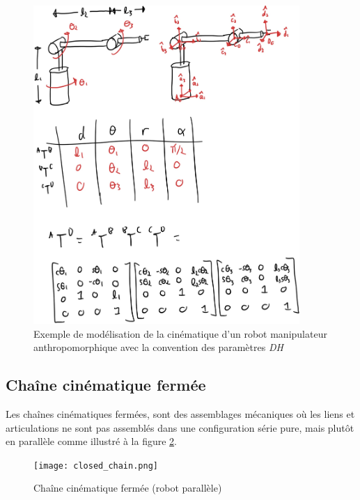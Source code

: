 \begin{figure}[H]
	\centering
	\includegraphics[width=0.90\textwidth]{fig/dh3.jpg}
	\caption{Exemple de modélisation de la cinématique d'un robot manipulateur anthropomorphique avec la convention des paramètres \textit{DH}}
	\label{fig:dh3}
\end{figure}










\newpage
\subsection{Chaîne cinématique fermée}

Les chaînes cinématiques fermées, sont des assemblages mécaniques où les liens et articulations ne sont pas assemblés dans une configuration série pure, mais plutôt en parallèle comme illustré à la figure \ref{fig:closed_chain}.
\begin{figure}[H]
	\centering
	\texttt{[image: closed\_chain.png]}
	\caption{Chaîne cinématique fermée (robot parallèle)}
	\label{fig:closed_chain}
\end{figure}

